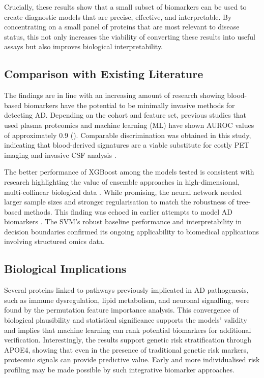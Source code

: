 \documentclass[a4paper,12pt]{article}
\begin{document}
Crucially, these results show that a small subset of biomarkers can be used to create diagnostic models that are precise, effective, and interpretable.  By concentrating on a small panel of proteins that are most relevant to disease status, this not only increases the viability of converting these results into useful assays but also improves biological interpretability.

\subsection{Comparison with Existing Literature}
The findings are in line with an increasing amount of research showing blood-based biomarkers have the potential to be minimally invasive methods for detecting AD.  Depending on the cohort and feature set, previous studies that used plasma proteomics and machine learning (ML) have shown AUROC values of approximately 0.9 (\cite{nagaraj2017plasma}). Comparable discrimination was obtained in this study, indicating that blood-derived signatures are a viable substitute for costly PET imaging and invasive CSF analysis \cite{hampel2018blood}.

The better performance of XGBoost among the models tested is consistent with research highlighting the value of ensemble approaches in high-dimensional, multi-collinear biological data \cite{chen2016xgboost}.  While promising, the neural network needed larger sample sizes and stronger regularisation to match the robustness of tree-based methods. This finding was echoed in earlier attempts to model AD biomarkers \cite{shahid2019applications}.  The SVM's robust baseline performance and interpretability in decision boundaries confirmed its ongoing applicability to biomedical applications involving structured omics data.

\subsection{Biological Implications}
Several proteins linked to pathways previously implicated in AD pathogenesis, such as immune dysregulation, lipid metabolism, and neuronal signalling, were found by the permutation feature importance analysis.  This convergence of biological plausibility and statistical significance supports the models' validity and implies that machine learning can rank potential biomarkers for additional verification.  Interestingly, the results support genetic risk stratification through APOE4, showing that even in the presence of traditional genetic risk markers, proteomic signals can provide predictive value.  Early and more individualised risk profiling may be made possible by such integrative biomarker approaches. 
\end{document}
